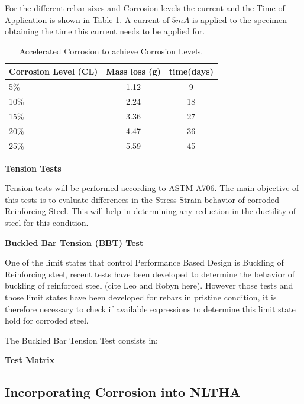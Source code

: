 For the different rebar sizes and Corrosion levels the current and the Time of Application is shown in Table \ref{tab:AcceleratedCorrosionTime}. A current of $5 mA$ is applied to the specimen obtaining the time this current needs to be applied for.

\begin{table}[htbp]
	\caption{Accelerated Corrosion to achieve Corrosion Levels.}
	\label{tab:AcceleratedCorrosionTime}
	\centering	
		\begin{tabular}{|l|c|c|}
		\hline
		Corrosion Level (CL) & Mass loss (g)   & time(days)     \\  \hline	
		5\%                  & 1.12            & 9  \\  \hline	
		10\%                 & 2.24            & 18 \\  \hline	
		15\%                 & 3.36            & 27 \\  \hline	
		20\%                 & 4.47            & 36 \\  \hline	
		25\%                 & 5.59            & 45 \\  \hline	
		\end{tabular}
\end{table}


\textbf{Tension Tests}

Tension tests will be performed according to ASTM A706. The main objective of this tests is to evaluate differences in the Stress-Strain behavior of corroded Reinforcing Steel. This will help in determining any reduction in the ductility of steel for this condition.

\textbf{Buckled Bar Tension (BBT) Test}

One of the limit states that control Performance Based Design is Buckling of Reinforcing steel, recent tests have been developed to determine the behavior of buckling of reinforced steel (cite Leo and Robyn here). However those tests and those limit states have been developed for rebars in pristine condition, it is therefore necessary to check if available expressions to determine this limit state hold for corroded steel.

The Buckled Bar Tension Test consists in:

\textbf{Test Matrix}

\subsection{Incorporating Corrosion into NLTHA}

